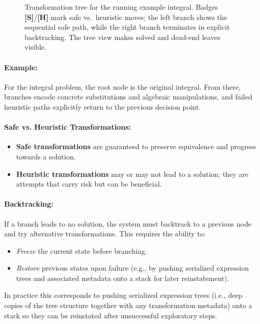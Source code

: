 \begin{figure}[h]
        \caption{Transformation tree for the running example integral. Badges \textbf{[S]}/\textbf{[H]} mark safe vs.\ heuristic moves; the left branch shows the sequential safe path, while the right branch terminates in explicit backtracking. The tree view makes solved and dead-end leaves visible.}
        \label{fig:lec3_transform_tree}
\end{figure}


\paragraph{Example:} For the integral problem, the root node is the original integral. From there, branches encode concrete substitutions and algebraic manipulations, and failed heuristic paths explicitly return to the previous decision point.

\paragraph{Safe vs. Heuristic Transformations:}
\begin{itemize}
  \raggedright
  \item \textbf{Safe transformations} are guaranteed to preserve equivalence and progress towards a solution.
  \item \textbf{Heuristic transformations} may or may not lead to a solution; they are attempts that carry risk but can be beneficial.
\end{itemize}

\paragraph{Backtracking:} If a branch leads to no solution, the system must backtrack to a previous node and try alternative transformations. This requires the ability to:
\begin{itemize}
  \item \emph{Freeze} the current state before branching.
  \item \emph{Restore} previous states upon failure (e.g., by pushing serialized expression trees and associated metadata onto a stack for later reinstatement).
\end{itemize}
In practice this corresponds to pushing serialized expression trees (i.e., deep copies of the tree structure together with any transformation metadata) onto a stack so they can be reinstated after unsuccessful exploratory steps.

